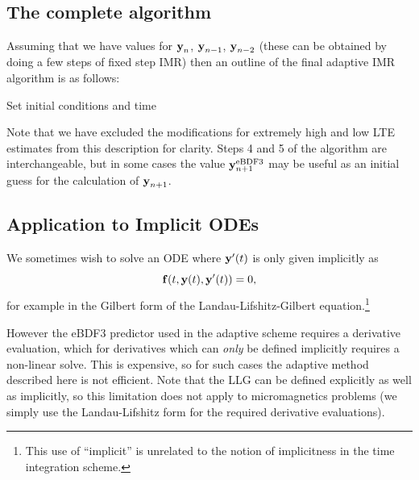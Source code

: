 \subsection{The complete algorithm}

Assuming that we have values for $\boldsymbol{\mathrm{y}}_n$, $\boldsymbol{\mathrm{y}}_{n-1}$, $\boldsymbol{\mathrm{y}}_{n-2}$ (these can be obtained \eg by doing a few steps of fixed step IMR) then an outline of the final adaptive IMR algorithm is as follows:

\begin{algorithm}[H]
  Set initial conditions and time\;
\end{algorithm}
Note that we have excluded the modifications for extremely high and low LTE estimates from this description for clarity.
Steps 4 and 5 of the algorithm are interchangeable, but in some cases the value $\boldsymbol{\mathrm{y}}_{n+1}^{\mathrm{eBDF3}}$ may be useful as an initial guess for the calculation of $\boldsymbol{\mathrm{y}}_{n+1}$.


\subsection{Application to Implicit ODEs}
\label{sec:extens-impl-odes}

We sometimes wish to solve an ODE where $\boldsymbol{\mathrm{y}}'(t)$ is only given implicitly as
\begin{equation}
  {\boldsymbol{\mathrm{f}}{\left( t, \boldsymbol{\mathrm{y}}(t), \boldsymbol{\mathrm{y}}'(t) \right)}} = 0,
\end{equation}
for example in the Gilbert form of the Landau-Lifshitz-Gilbert equation.\footnote{This use of ``implicit'' is unrelated to the notion of implicitness in the time integration scheme.}

However the eBDF3 predictor used in the adaptive scheme requires a derivative evaluation, which for derivatives which can \emph{only} be defined implicitly requires a non-linear solve.
This is expensive, so for such cases the adaptive method described here is not efficient.
Note that the LLG can be defined explicitly as well as implicitly, so this limitation does not apply to micromagnetics problems (we simply use the Landau-Lifshitz form for the required derivative evaluations).


